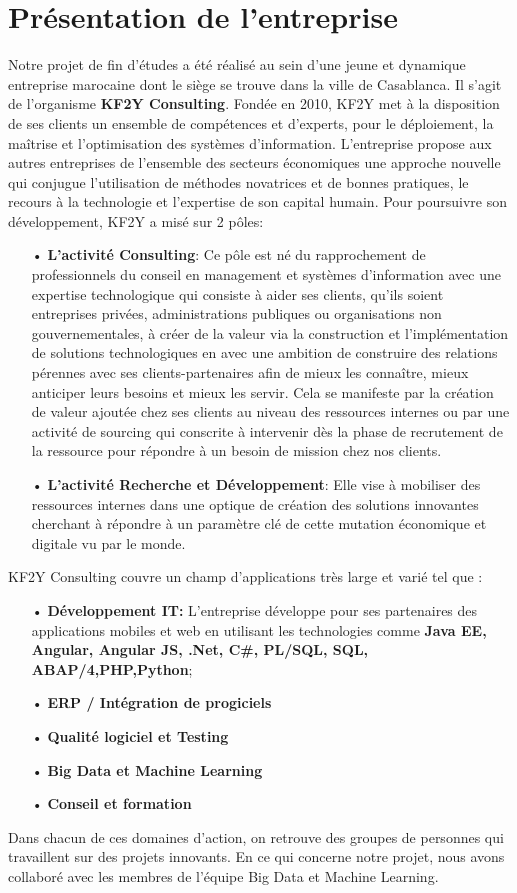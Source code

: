 \section{Présentation de l'entreprise}

Notre projet de fin d’études a été réalisé au sein d’une jeune et dynamique entreprise marocaine dont le siège se trouve dans la ville de Casablanca. Il s’agit de l’organisme \textbf{KF2Y Consulting}. Fondée en 2010, KF2Y met à la disposition de ses clients un ensemble de compétences et d’experts, pour le déploiement, la maîtrise et l’optimisation des systèmes d’information. L’entreprise propose aux autres entreprises de l'ensemble des secteurs économiques une approche nouvelle qui conjugue l'utilisation de méthodes novatrices et de bonnes pratiques, le recours à la technologie et l'expertise de son capital humain. Pour poursuivre son développement, KF2Y a misé sur 2 pôles:
    \begin{itemize}
        \item[•] \textbf{L’activité Consulting}: 
        Ce pôle est né du rapprochement de professionnels du conseil en management et systèmes d’information avec une expertise technologique qui consiste à aider ses clients, qu’ils soient entreprises privées, administrations publiques ou organisations non gouvernementales, à créer de la valeur via la construction et l’implémentation de solutions technologiques en avec une ambition de construire des relations pérennes avec ses  clients-partenaires afin de mieux les connaître, mieux anticiper leurs besoins et mieux les servir. Cela se manifeste par la création de valeur ajoutée chez ses clients au niveau des ressources internes ou par une activité de sourcing qui conscrite à intervenir dès la phase de recrutement de la ressource pour répondre à un besoin de mission chez nos clients.
        \item[•] \textbf{L’activité Recherche et Développement}: Elle vise à mobiliser des ressources internes dans une optique de création des solutions innovantes cherchant à répondre à un paramètre clé de cette mutation économique et digitale vu par le monde.
    \end{itemize}
 KF2Y Consulting couvre un champ d’applications très large et varié tel que :
    \begin{enumerate}
        \item[•] \textbf{Développement IT:} L'entreprise développe pour ses partenaires des applications mobiles et web en utilisant les technologies comme \textbf{Java EE, Angular, Angular JS, .Net, C\#, PL/SQL, SQL, ABAP/4,PHP,Python};
        \item[•] \textbf{ERP / Intégration de progiciels}
        \item[•] \textbf{Qualité logiciel et Testing}
        \item[•] \textbf{Big Data et Machine Learning}
        \item[•]  \textbf{Conseil et formation}
    \end{enumerate}
Dans chacun de ces domaines d'action, on retrouve des groupes de personnes qui travaillent sur des projets innovants. En ce qui concerne notre projet, nous avons collaboré avec les membres de l'équipe Big Data et Machine Learning.